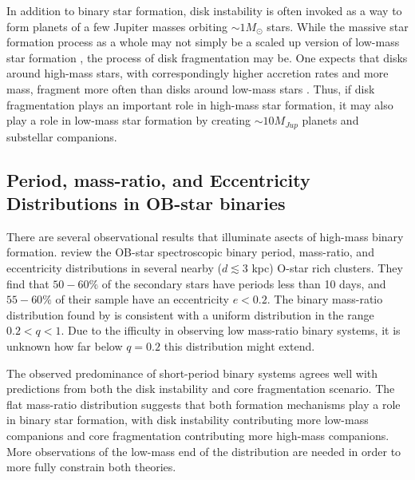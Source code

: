 \documentclass[11pt]{report}     %
\begin{document}
In addition to binary star formation, disk instability is often invoked as a way
to form planets of a few Jupiter masses orbiting $\sim 1 M_{\odot}$ stars.
While the massive star formation process as a
whole may not simply be a scaled up version of low-mass star
formation \citep{Zinnecker2007}, the process of disk fragmentation may
be. One expects that disks around high-mass stars, with correspondingly higher accretion rates
and more mass, fragment more often than disks around low-mass stars \citep{Boss2011, Boss2006,
  Sally2009, Kratter2006}. Thus, if disk fragmentation plays an important role
in high-mass star formation, it may also play a role in low-mass star
formation by creating $\sim 10M_{Jup}$ planets and substellar companions.

\subsection{Period, mass-ratio, and Eccentricity Distributions in
  OB-star binaries}
There are several observational results that illuminate asects of high-mass
binary formation. \cite{Sana2011} review the OB-star spectroscopic binary
period, mass-ratio, and eccentricity distributions in several nearby
($d \lesssim 3$ kpc) O-star rich clusters. 
They find that $50-60\%$ of the secondary stars have periods less than
10 days, and $55-60\%$ of their sample have an
eccentricity $e < 0.2$. 
The binary mass-ratio distribution found by \cite{Sana2011} is
consistent with a uniform distribution in the range $0.2 < q < 1$. Due to the ifficulty in observing low
mass-ratio binary systems, it is unknown how far below $q = 0.2$ this
distribution might extend.

The observed predominance of short-period binary systems agrees well with predictions
from both the disk instability and core fragmentation scenario. 
The flat mass-ratio distribution suggests that both formation mechanisms play a role in binary
star formation, with disk instability contributing more low-mass companions and core fragmentation 
contributing more high-mass companions. More observations of the low-mass end of the distribution
are needed in order to more fully constrain both theories.
\end{document}
